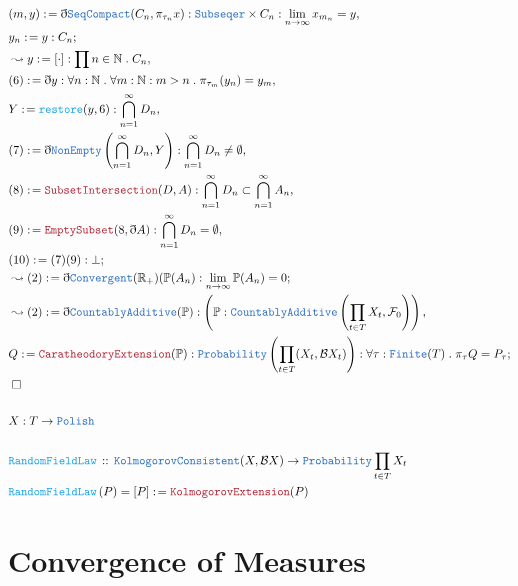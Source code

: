 \documentclass[12pt]{scrartcl}
\newcommand{\TYPE}[1]{\textcolor{NavyBlue}{\mathtt{#1}}}
\newcommand{\FUNC}[1]{\textcolor{Cerulean}{\mathtt{#1}}}
\newcommand{\THM}[1]{\textcolor{Maroon}{\mathtt{#1}}}
\renewcommand{\.}{\; . \;}
\newcommand{\de}{: \kern 0.1pc =}
\newcommand{\Act}[1]{\left( #1 \right)}
\newcommand{\DeclareFunc}[2]{& \FUNC{#1} \, :: \, #2 \\}
\newcommand{\DefineNamedFunc}[4]{&  \FUNC{#1}\Act{#2} = #3 \de #4 \\}
\newcommand{\Reals}{\mathbb{R} }
\newcommand{\Nat}{\mathbb{N} }
\newcommand{\Say}[3]{& #1 \de #2 : #3, \\}
\newcommand{\Conclude}[3]{& #1 \de #2 : #3; \\}
\newcommand{\Derive}[3]{& \leadsto #1 \de #2 : #3, \\}
\newcommand{\DeriveConclude}[3]{& \leadsto #1 \de #2 : #3 ; \\}
\newcommand{\QED}{\; \square}
\newcommand{\EndProof}{& \QED \\}
\newcommand{\ByDef}{\eth}
\newcommand{\F}{\mathcal{F}}
\newcommand{\B}{\mathcal{B}}
\begin{document}
\newpage
\begin{align*}
\Say{(m,y)}{ \ByDef\TYPE{SeqCompact}(C_n, \pi_{\tau_n} x )   }{ \TYPE{Subseqer} \times C_n : \lim_{n \to \infty} x_{m_n} = y }
\Conclude{y_n}{y}{C_n}
\Derive{y}{[\cdot]}{\prod n \in \Nat \. C_n}
\Say{(6)}{\ByDef y  }{  \forall n : \Nat \. \forall m : \Nat : m > n \. \pi_{\tau_m}(y_n) = y_m  }
\Say{ Y }{\FUNC{restore}(y,6)}{ \bigcap^\infty_{n =1 } D_n  }
\Say{ (7) }{ \ByDef\TYPE{NonEmpty}\left( \bigcap^\infty_{n = 1} D_n, Y \right)    }{ \bigcap^\infty_{n = 1} D_n \neq \emptyset }
\Say{ (8) }{ \THM{SubsetIntersection}(D,A)}{ \bigcap^\infty_{n = 1} D_n \subset \bigcap^\infty_{n = 1} A_n   }
\Say{(9)}{ \THM{EmptySubset}(8, \ByDef A) }{ \bigcap^\infty_{n = 1} D_n = \emptyset }
\Conclude{(10)}{(7)(9)}{ \bot }
\DeriveConclude{ (2)  }{ \ByDef\TYPE{Convergent}(\Reals_+)( \mathbb{P}(A_n )}{ \lim_{n \to \infty} \mathbb{P}(A_n) = 0 }
\Derive{ (2) }{ \ByDef\TYPE{CountablyAdditive}(\mathbb{P}) }{ \left( \mathbb{P} : \TYPE{CountablyAdditive}\left( \prod_{t \in T} X_t, \F_0 \right) \right) }
\Conclude{ Q  }{\THM{CaratheodoryExtension}(\mathbb{P}) }{ \TYPE{Probability} \left( \prod_{t \in T} (X_t, \B X_t) \right)
: \forall \tau : \TYPE{Finite}(T) \. \pi_{\tau} Q = P_\tau
}
\EndProof
\\
& X : T \to \TYPE{Polish} \\
\\
\DeclareFunc{ RandomFieldLaw  }{ \TYPE{KolmogorovConsistent}(X, \B X) \to  \TYPE{Probability} \prod_{t \in T} X_t  }
\DefineNamedFunc{ RandomFieldLaw  }{ P }{[P]}{ \THM{ KolmogorovExtension  }(P) }
\end{align*}
\section{Convergence of Measures}
\end{document}

